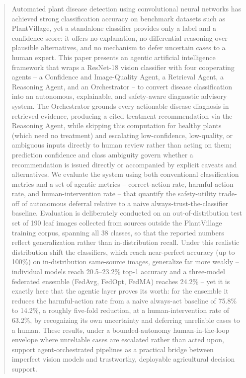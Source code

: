 \documentclass[conference]{IEEEtran}
\begin{document}
\begin{abstract}
Automated plant disease detection using convolutional neural networks has achieved strong classification accuracy on benchmark datasets such as PlantVillage, yet a standalone classifier provides only a label and a confidence score: it offers no explanation, no differential reasoning over plausible alternatives, and no mechanism to defer uncertain cases to a human expert. This paper presents an agentic artificial intelligence framework that wraps a ResNet-18 vision classifier with four cooperating agents -- a Confidence and Image-Quality Agent, a Retrieval Agent, a Reasoning Agent, and an Orchestrator -- to convert disease classification into an autonomous, explainable, and safety-aware diagnostic advisory system. The Orchestrator grounds every actionable disease diagnosis in retrieved evidence, producing a cited treatment recommendation via the Reasoning Agent, while skipping this computation for healthy plants (which need no treatment) and escalating low-confidence, low-quality, or ambiguous inputs directly to human review rather than acting on them; prediction confidence and class ambiguity govern whether a recommendation is issued directly or accompanied by explicit caveats and alternatives. We evaluate the system using both conventional classification metrics and a set of agentic metrics -- correct-action rate, harmful-action rate, and human-intervention rate -- that quantify the safety-utility trade-off of autonomous deferral relative to a naive always-trust-the-classifier baseline. Evaluation is deliberately conducted on an out-of-distribution test set of 190 leaf images collected from sources outside the PlantVillage training corpus, spanning all 38 classes, so that the reported numbers reflect generalization rather than in-distribution recall. Under this realistic distribution shift the classifiers, which reach near-perfect accuracy (up to 100\%) on in-distribution same-source images, generalize far more weakly -- individual models reach 20.5--23.2\% top-1 accuracy and a three-model federated ensemble (FedAvg, FedOpt, FedMA) reaches 24.2\% -- yet it is exactly here that the agentic layer proves its worth: for the ensemble it reduces the harmful-action rate from a naive always-act baseline of 75.8\% to 14.2\%, a roughly five-fold reduction, at a human-intervention rate of 63.2\%, by recognizing its own uncertainty and deferring unreliable cases to a human. These results, under a bounded-autonomy human-in-the-loop envelope where unreliable cases are escalated rather than acted upon, support agent-orchestrated pipelines as a practical bridge between imperfect vision models and trustworthy, deployable agricultural decision support.
\end{abstract}
\end{document}
